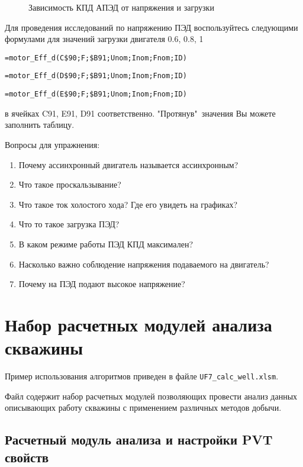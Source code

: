 \begin{figure}[h!]
	\center{\texttt{[image: Ex80\_3]}}
	\caption{Зависимость КПД АПЭД от напряжения и загрузки}
	\label{ris:Ex80_3}
\end{figure}

Для проведения исследований по напряжению ПЭД воспользуйтесь следующими формулами для значений загрузки двигателя 0.6, 0.8, 1 

{ \small  \texttt{=motor\_Eff\_d(C\$90;F;\$B91;Unom;Inom;Fnom;ID)}}

{ \small  \texttt{=motor\_Eff\_d(D\$90;F;\$B91;Unom;Inom;Fnom;ID)}}

{ \small  \texttt{=motor\_Eff\_d(E\$90;F;\$B91;Unom;Inom;Fnom;ID)}}

в ячейках C91, E91, D91 соответственно. "Протянув"\ значения Вы можете заполнить таблицу.

Вопросы для упражнения:

\begin{enumerate}
	\item Почему ассинхронный двигатель называется ассинхронным?
	\item Что такое проскальзывание?
	\item Что такое ток холостого хода? Где его увидеть на графиках?
	\item Что то такое загрузка ПЭД?
	\item В каком режиме работы ПЭД КПД максимален?
	\item Насколько важно соблюдение напряжения подаваемого на двигатель?
	\item Почему на ПЭД подают высокое напряжение?
\end{enumerate}


\section{Набор расчетных модулей анализа скважины}
Пример использования алгоритмов \unf   приведен в файле \texttt{UF7\_calc\_well.xlsm}.

Файл содержит набор расчетных модулей позволяющих провести анализ данных описывающих работу скважины с применением различных методов добычи.

\subsection{Расчетный модуль анализа и настройки PVT свойств}

